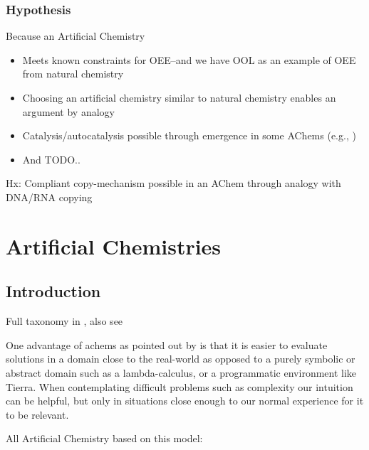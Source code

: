 \subsection{Hypothesis}\label{hypothesis}

Because an Artificial Chemistry
\begin{itemize}
	\item
 Meets known constraints for OEE--and we have OOL as an example of OEE
 from natural chemistry
	\item
 Choosing an artificial chemistry similar to natural chemistry enables
 an argument by analogy
	\item
 Catalysis/autocatalysis possible through emergence in some AChems
 (e.g., \autocite{Virgo2013})
	\item
 And TODO..
\end{itemize}

Hx: Compliant copy-mechanism possible in an AChem through analogy with DNA/RNA copying

\chapter{Artificial Chemistries}\label{artificial-chemistries}

\section{Introduction}\label{introduction-2}

Full taxonomy in \autocite{Dittrich:2001zr}, also see \autocite{Faulconbridge2011}

One advantage of \glspl{achem} as pointed out by
\autocite[5]{Funes2001} is that it is easier to evaluate solutions in
a domain close to the real-world as opposed to a purely symbolic or
abstract domain such as a lambda-calculus, or a programmatic environment
like Tierra. When contemplating difficult problems such as complexity
our intuition can be helpful, but only in situations close enough to our
normal experience for it to be relevant.

All Artificial Chemistry based on this model:

\begin{figure}[t]
	\begin{center}
	\end{center}
\end{figure}

